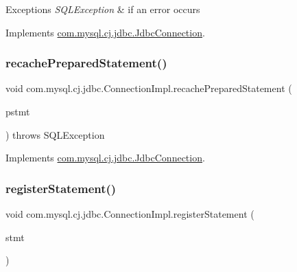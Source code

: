 \begin{DoxyExceptions}{Exceptions}
{\em S\+Q\+L\+Exception} & if an error occurs \\
\hline
\end{DoxyExceptions}


Implements \mbox{\hyperlink{interfacecom_1_1mysql_1_1cj_1_1jdbc_1_1_jdbc_connection_af5f24cb10cfc14e0174c6bb115745bc0}{com.\+mysql.\+cj.\+jdbc.\+Jdbc\+Connection}}.

\mbox{\label{classcom_1_1mysql_1_1cj_1_1jdbc_1_1_connection_impl_a7c4a014cd0c2d58c91a091ec4976434c}} 
\subsubsection{\texorpdfstring{recache\+Prepared\+Statement()}{recachePreparedStatement()}}
{\footnotesize\ttfamily void com.\+mysql.\+cj.\+jdbc.\+Connection\+Impl.\+recache\+Prepared\+Statement (\begin{DoxyParamCaption}\item[{\mbox{\hyperlink{interfacecom_1_1mysql_1_1cj_1_1jdbc_1_1_jdbc_prepared_statement}{Jdbc\+Prepared\+Statement}}}]{pstmt }\end{DoxyParamCaption}) throws S\+Q\+L\+Exception}



Implements \mbox{\hyperlink{interfacecom_1_1mysql_1_1cj_1_1jdbc_1_1_jdbc_connection_a24f00ff038a4f01aab9dea9e2817c084}{com.\+mysql.\+cj.\+jdbc.\+Jdbc\+Connection}}.

\mbox{\label{classcom_1_1mysql_1_1cj_1_1jdbc_1_1_connection_impl_a34559497cf5a4650696890f1de8a0a78}} 
\subsubsection{\texorpdfstring{register\+Statement()}{registerStatement()}}
{\footnotesize\ttfamily void com.\+mysql.\+cj.\+jdbc.\+Connection\+Impl.\+register\+Statement (\begin{DoxyParamCaption}\item[{\mbox{\hyperlink{interfacecom_1_1mysql_1_1cj_1_1jdbc_1_1_jdbc_statement}{Jdbc\+Statement}}}]{stmt }\end{DoxyParamCaption})}

